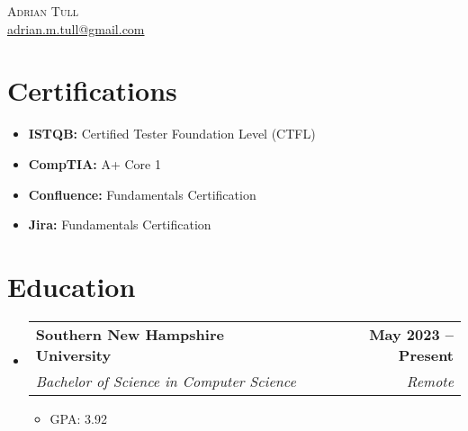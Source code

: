 \documentclass[letterpaper,11pt]{article}
\makeatletter
\newcommand{\resumeItem}[1]{
  \item\small{ {#1 \vspace{-2pt}} }
}
\newcommand{\resumeSubheading}[4]{
  \vspace{-2pt}\item
    \begin{tabular*}{1.0\textwidth}[t]{l@{\extracolsep{\fill}}r}
      \textbf{#1} & \textbf{\small #2} \\
      \textit{\small #3} & \textit{\small #4} \\
    \end{tabular*}\vspace{-7pt}
}
\newcommand{\resumeSubHeadingListStart}{\begin{itemize}[leftmargin=0in, label={}]}
\newcommand{\resumeSubHeadingListEnd}{\end{itemize}}
\newcommand{\resumeItemListStart}{\begin{itemize}}
\newcommand{\resumeItemListEnd}{\end{itemize}\vspace{-5pt}}
\makeatother
\begin{document}
\begin{center}
    {\Huge \scshape Adrian Tull} \\ \vspace{2pt}
    \href{mailto:adrian.m.tull@gmail.com}{adrian.m.tull@gmail.com}
\end{center}

\section{Certifications}
\resumeSubHeadingListStart
    \resumeItem{\textbf{ISTQB:} Certified Tester Foundation Level (CTFL)}
    \resumeItem{\textbf{CompTIA:} A+ Core 1}
    \resumeItem{\textbf{Confluence:} Fundamentals Certification}
    \resumeItem{\textbf{Jira:} Fundamentals Certification}
\resumeSubHeadingListEnd

\section{Education}
\resumeSubHeadingListStart
    \resumeSubheading
      {Southern New Hampshire University}{May 2023 -- Present}
      {Bachelor of Science in Computer Science}{Remote}
    \resumeItemListStart
        \resumeItem{GPA: 3.92}
    \resumeItemListEnd
\resumeSubHeadingListEnd

\end{document}
